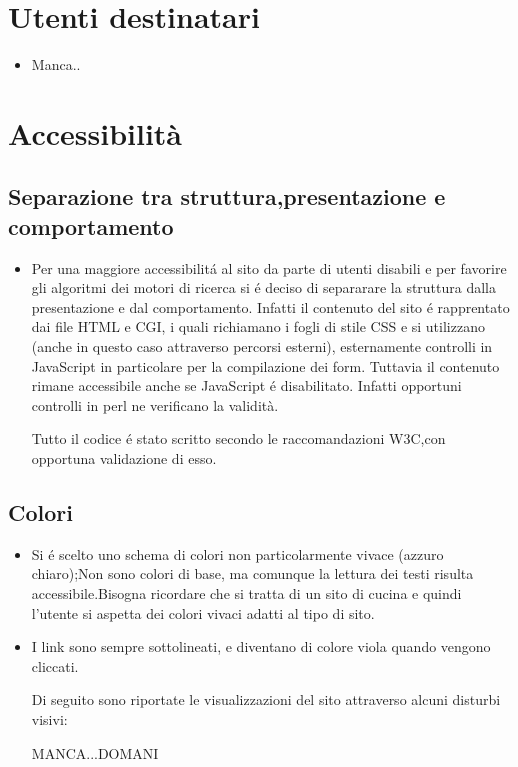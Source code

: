 \documentclass[12pt]{article}
\begin{document}
		\section{Utenti destinatari}
		\begin{itemize}
			\item Manca..
		\end{itemize}
		\section{Accessibilit\`a}
		\subsection{Separazione tra struttura,presentazione e comportamento}
		\begin{itemize}
			\item Per una maggiore accessibilit\'a al sito da parte di utenti disabili e per favorire gli algoritmi dei motori di ricerca si \'e deciso di separarare la struttura dalla presentazione e dal comportamento.
			Infatti il contenuto del sito \'e rapprentato dai file HTML e CGI, i quali richiamano i fogli di stile CSS e si utilizzano (anche in questo caso attraverso percorsi esterni), esternamente controlli in JavaScript in particolare per la compilazione dei form. Tuttavia il contenuto rimane accessibile anche se JavaScript \'e disabilitato. Infatti opportuni controlli in perl ne verificano la validit\`a.

			Tutto il codice \'e stato scritto secondo le raccomandazioni W3C,con opportuna validazione di esso.
		\end{itemize}
			\subsection{Colori}
			\begin{itemize}
				\item Si \'e scelto uno schema di colori non particolarmente vivace (azzuro chiaro);Non sono colori di base, ma comunque la lettura dei testi risulta accessibile.Bisogna ricordare che si tratta di un sito di cucina e quindi l'utente si aspetta dei colori vivaci adatti al tipo di sito. 

				\item I link sono sempre sottolineati, e diventano di colore viola quando vengono cliccati.

				Di seguito sono riportate le visualizzazioni del sito attraverso alcuni disturbi visivi:

				MANCA...DOMANI
			\end{itemize}	
			
\end{document}
